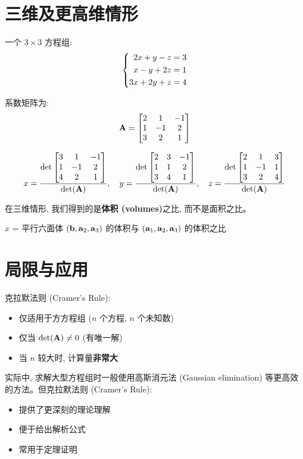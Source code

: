 \section{三维及更高维情形}

\begin{example}
一个 $3 \times 3$ 方程组:
\[
\left\{\begin{aligned} 
2x + y - z &= 3 \\
x - y + 2z &= 1 \\
3x + 2y + z &= 4
 \end{aligned}\right.
\]

系数矩阵为:
\[
\mathbf{A} = \begin{bmatrix} 2 & 1 & -1 \\ 1 & -1 & 2 \\ 3 & 2 & 1 \end{bmatrix}
\]

\[
x = \frac{\det\begin{bmatrix} 3 & 1 & -1 \\ 1 & -1 & 2 \\ 4 & 2 & 1 \end{bmatrix}}{\det(\mathbf{A})}, \quad
y = \frac{\det\begin{bmatrix} 2 & 3 & -1 \\ 1 & 1 & 2 \\ 3 & 4 & 1 \end{bmatrix}}{\det(\mathbf{A})}, \quad
z = \frac{\det\begin{bmatrix} 2 & 1 & 3 \\ 1 & -1 & 1 \\ 3 & 2 & 4 \end{bmatrix}}{\det(\mathbf{A})}
\]
\end{example}

\begin{intuition}
在三维情形, 我们得到的是\textbf{体积 (volumes)}之比, 而不是面积之比。

$x$ = 平行六面体 $(\mathbf{b}, \mathbf{a}_2, \mathbf{a}_3)$ 的体积与 $(\mathbf{a}_1, \mathbf{a}_2, \mathbf{a}_3)$ 的体积之比
\end{intuition}

\section{局限与应用}

\begin{warning}
克拉默法则 (Cramer's Rule):
\begin{itemize}
    \item 仅适用于方方程组 ($n$ 个方程, $n$ 个未知数)
    \item 仅当 $\det(\mathbf{A}) \neq 0$ (有唯一解)
    \item 当 $n$ 较大时, 计算量\textbf{非常大}
\end{itemize}
\end{warning}

\begin{remark}
实际中, 求解大型方程组时一般使用高斯消元法 (Gaussian elimination) 等更高效的方法。但克拉默法则 (Cramer's Rule):
\begin{itemize}
    \item 提供了更深刻的理论理解
    \item 便于给出解析公式
    \item 常用于定理证明
\end{itemize}
\end{remark}

